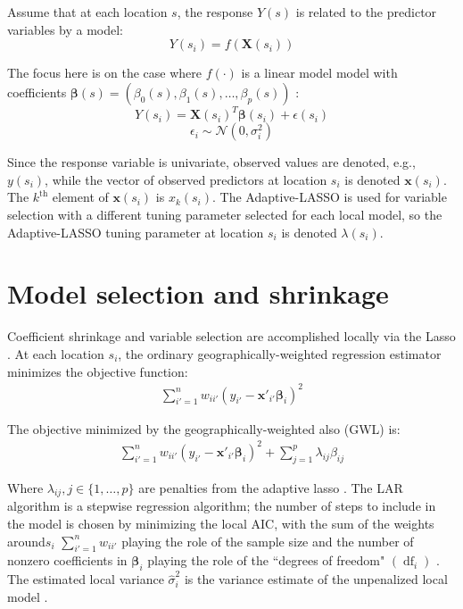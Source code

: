 \documentclass[authoryear, review, 11pt]{elsarticle}
\DeclareMathOperator*{\df}{\mbox{df}}
\begin{document}
	Assume that at each location $s$, the response $Y(s)$ is related to the predictor variables by a model:\\
	
	\[
		Y(s_i) = f \left(\bm{X}(s_i) \right) %
	\]
	
	The focus here is on the case where $f(\cdot)$ is a linear model model with coefficients $\bm{\beta}(s) = (\beta_0(s), \beta_1(s), \dots, \beta_p(s))$ :\\
	\[
		Y(s_i) = \bm{X}(s_i)^T \bm{\beta}(s_i) + \epsilon(s_i)
	\]
	\[
		\epsilon_i \sim \bm{\mathcal{N}} \left( 0, \sigma_i^2 \right)
	\]
	
	Since the response variable is univariate, observed values are denoted, e.g., $y(s_i)$, while the vector of observed predictors at location $s_i$ is denoted $\bm{x}(s_i)$. The $k^{\text{th}}$ element of $\bm{x}(s_i)$ is $x_k(s_i)$. The Adaptive-LASSO is used for variable selection with a different tuning parameter selected for each local model, so the Adaptive-LASSO tuning parameter at location $s_i$ is denoted $\lambda(s_i)$.\\ 
	

\section{Model selection and shrinkage \label{section:method}}
	Coefficient shrinkage and variable selection are accomplished locally via the Lasso \citep{Tibshirani:1996}. At each location $s_i$, the ordinary geographically-weighted regression estimator minimizes the objective function:\\

	\begin{eqnarray}
		\sum_{i'=1}^n w_{ii'} \left(y_{i'} - \bm{x}'_{i'} \bm{\beta}_i \right)^2
	\end{eqnarray}
	
	The objective minimized by the geographically-weighted also (GWL) is:\\
	
	\begin{eqnarray}
		\sum_{i'=1}^n w_{ii'} \left(y_{i'} - \bm{x}'_{i'} \bm{\beta}_i \right)^2 + \sum_{j=1}^p \lambda_{ij} \beta_{ij}
	\end{eqnarray}
	
	Where $\lambda_{ij}, j \in \{1, \dots, p\}$ are penalties from the adaptive lasso \citep{Zou:2006}. The LAR algorithm is a
stepwise regression algorithm; the number of steps to include in the model is chosen by minimizing
the local AIC, with the sum of the weights around$s_i$ $\sum_{i'=1}^n w_{ii'}$ playing the role of the sample size and the number of nonzero coefficients in $\bm{\beta}_i$ playing the role of the ``degrees of freedom" $\left( \df_i \right)$ \citep{Zou:2007}. The estimated local variance $\hat{\sigma}_i^2$ is the variance estimate of the unpenalized local model \citep{Zou:2007}.\\
\end{document}
